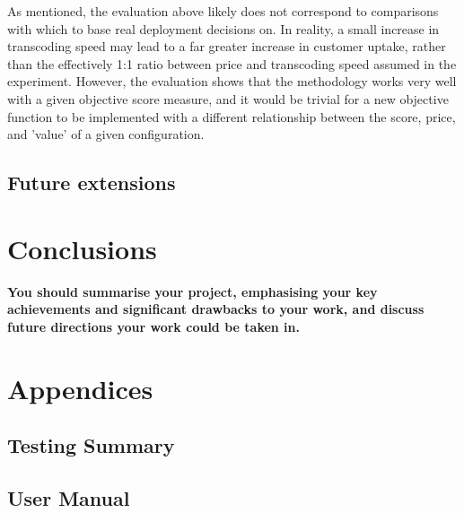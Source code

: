 \documentclass{article}
\begin{document}
As mentioned, the evaluation above likely does not correspond to comparisons with which to base real deployment decisions on. In reality, a small increase in transcoding speed may lead to a far greater increase in customer uptake, rather than the effectively 1:1 ratio between price and transcoding speed assumed in the experiment. However, the evaluation shows that the methodology works very well with a given objective score measure, and it would be trivial for a new objective function to be implemented with a different relationship between the score, price, and 'value' of a given configuration.
\subsection{Future extensions}
\section{Conclusions}
\textbf{You should summarise your project, emphasising your
key achievements and significant drawbacks to your
work, and discuss future directions your work could be
taken in.}
\newpage


\newpage
\section*{Appendices}
\subsection*{Testing Summary}
\subsection*{User Manual}
\end{document}

